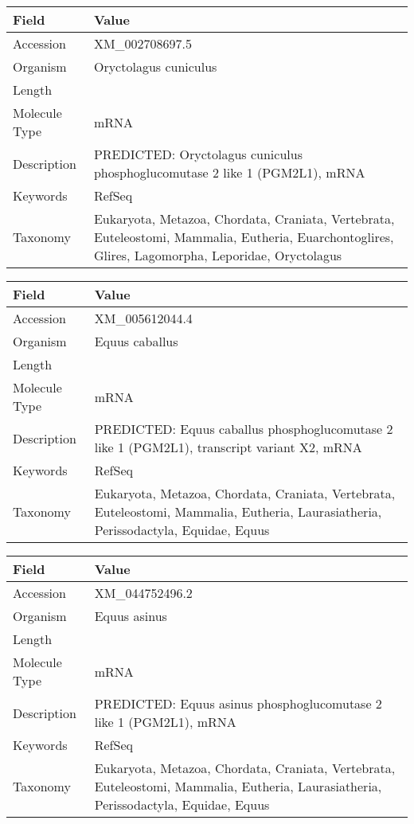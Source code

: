 \documentclass[10pt]{article}
\begin{document}
{\footnotesize
\begin{longtable}{>{\raggedright\arraybackslash}p{4.5cm} >{\raggedright\arraybackslash}p{11.5cm}}
\textbf{Field} & \textbf{Value} \\
\hline
Accession & XM\_002708697.5 \\
Organism & Oryctolagus cuniculus \\
Length & 8422 \\
Molecule Type & mRNA \\
Description & PREDICTED: Oryctolagus cuniculus phosphoglucomutase 2 like 1 (PGM2L1), mRNA \\
Keywords & RefSeq \\
Taxonomy & Eukaryota, Metazoa, Chordata, Craniata, Vertebrata, Euteleostomi, Mammalia, Eutheria, Euarchontoglires, Glires, Lagomorpha, Leporidae, Oryctolagus \\
\end{longtable}
}

{\footnotesize
\begin{longtable}{>{\raggedright\arraybackslash}p{4.5cm} >{\raggedright\arraybackslash}p{11.5cm}}
\textbf{Field} & \textbf{Value} \\
\hline
Accession & XM\_005612044.4 \\
Organism & Equus caballus \\
Length & 3005 \\
Molecule Type & mRNA \\
Description & PREDICTED: Equus caballus phosphoglucomutase 2 like 1 (PGM2L1), transcript variant X2, mRNA \\
Keywords & RefSeq \\
Taxonomy & Eukaryota, Metazoa, Chordata, Craniata, Vertebrata, Euteleostomi, Mammalia, Eutheria, Laurasiatheria, Perissodactyla, Equidae, Equus \\
\end{longtable}
}

{\footnotesize
\begin{longtable}{>{\raggedright\arraybackslash}p{4.5cm} >{\raggedright\arraybackslash}p{11.5cm}}
\textbf{Field} & \textbf{Value} \\
\hline
Accession & XM\_044752496.2 \\
Organism & Equus asinus \\
Length & 3646 \\
Molecule Type & mRNA \\
Description & PREDICTED: Equus asinus phosphoglucomutase 2 like 1 (PGM2L1), mRNA \\
Keywords & RefSeq \\
Taxonomy & Eukaryota, Metazoa, Chordata, Craniata, Vertebrata, Euteleostomi, Mammalia, Eutheria, Laurasiatheria, Perissodactyla, Equidae, Equus \\
\end{longtable}
}
\end{document}
